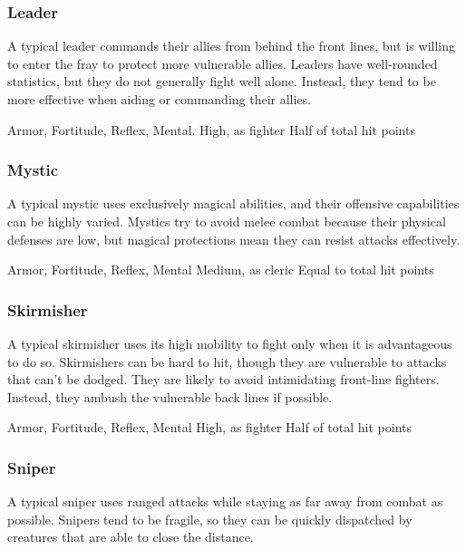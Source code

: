         \subsubsection{Leader}
            A typical leader commands their allies from behind the front lines, but is willing to enter the fray to protect more vulnerable allies.
            Leaders have well-rounded statistics, but they do not generally fight well alone.
            Instead, they tend to be more effective when aiding or commanding their allies.

              Armor,  Fortitude,  Reflex,  Mental.
             High, as fighter
             Half of total hit points

        \subsubsection{Mystic}
            A typical mystic uses exclusively magical abilities, and their offensive capabilities can be highly varied.
            Mystics try to avoid melee combat because their physical defenses are low, but magical protections mean they can resist attacks effectively.

              Armor,  Fortitude,  Reflex,  Mental
             Medium, as cleric
             Equal to total hit points

        \subsubsection{Skirmisher}
            A typical skirmisher uses its high mobility to fight only when it is advantageous to do so.
            Skirmishers can be hard to hit, though they are vulnerable to attacks that can't be dodged.
            They are likely to avoid intimidating front-line fighters.
            Instead, they ambush the vulnerable back lines if possible.

              Armor,  Fortitude,  Reflex,  Mental
             High, as fighter
             Half of total hit points

        \subsubsection{Sniper}
            A typical sniper uses ranged attacks while staying as far away from combat as possible.
            Snipers tend to be fragile, so they can be quickly dispatched by creatures that are able to close the distance.

